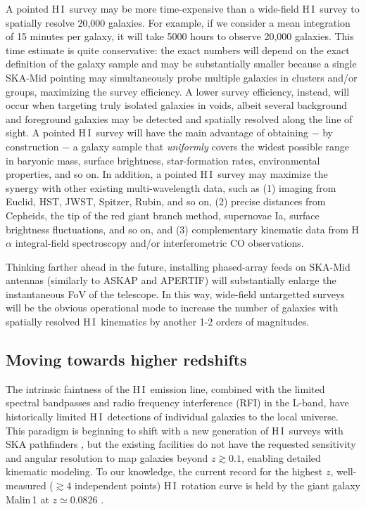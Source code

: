 \documentclass[a4paper,11pt]{article}
\newcommand{\hi } {{\rm H}\,{\small\rm I}}
\begin{document}
A pointed \hi\ survey may be more time-expensive than a wide-field \hi\ survey to spatially resolve 20,000 galaxies. For example, if we consider a mean integration of 15 minutes per galaxy, it will take 5000 hours to observe 20,000 galaxies. This time estimate is quite conservative: the exact numbers will depend on the exact definition of the galaxy sample and may be substantially smaller because a single SKA-Mid pointing may simultaneously probe multiple galaxies in clusters and/or groups, maximizing the survey efficiency. A lower survey efficiency, instead, will occur when targeting truly isolated galaxies in voids, albeit several background and foreground galaxies may be detected and spatially resolved along the line of sight. A pointed \hi\ survey will have the main advantage of obtaining $-$ by construction $-$ a galaxy sample that \emph{uniformly} covers the widest possible range in baryonic mass, surface brightness, star-formation rates, environmental properties, and so on. In addition, a pointed \hi\ survey may maximize the synergy with other existing multi-wavelength data, such as (1) imaging from Euclid, HST, JWST, Spitzer, Rubin, and so on, (2) precise distances from Cepheids, the tip of the red giant branch method, supernovae Ia, surface brightness fluctuations, and so on, and (3) complementary kinematic data from H$\alpha$ integral-field spectroscopy and/or interferometric CO observations.

Thinking farther ahead in the future, installing phased-array feeds on SKA-Mid antennas (similarly to ASKAP and APERTIF) will substantially enlarge the instantaneous FoV of the telescope. In this way, wide-field untargetted surveys will be the obvious operational mode to increase the number of galaxies with spatially resolved \hi\ kinematics by another 1-2 orders of magnitudes.

\subsection{Moving towards higher redshifts}\label{sec:highz}

The intrinsic faintness of the \hi\ emission line, combined with the limited spectral bandpasses and radio frequency interference (RFI) in the L-band, have historically limited \hi\ detections of individual galaxies to the local universe.  This paradigm is beginning to shift with a new generation of \hi\ surveys with SKA pathfinders \citep{Hess2019, Ponomareva2021, Xi2024, Jarvis2025}, but the existing facilities do not have the requested sensitivity and angular resolution to map galaxies beyond $z \gtrsim 0.1$, enabling detailed kinematic modeling. To our knowledge, the current record for the highest $z$, well-measured ($\gtrsim$4 independent points) \hi\ rotation curve is held by the giant galaxy Malin\,1 at $z\simeq0.0826$ \citep{Pickering1997, Lelli2010}.
\end{document}
